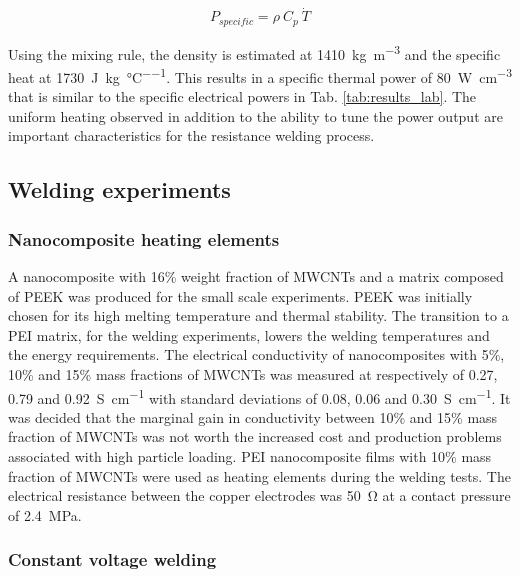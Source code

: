 \documentclass[11pt,review,times]{elsarticle}
\begin{document}
\begin{equation}
P_{specific} = \rho \ C_p \ \dot{T}
\label{eq:specific_power}
\end{equation}

Using the mixing rule, the density is estimated at \SI{1410}{\kilo\gram\per\cubic\metre} and the specific heat at \SI{1730}{\joule\per\kilo\gram\per\celsius}. 
This results in a specific thermal power of \SI{80}{\watt\per\cubic\centi\metre} that is similar to the specific electrical powers in Tab. \ref{tab:results_lab}. 
The uniform heating observed in addition to the ability to tune the power output are important characteristics for the resistance welding process.  

\FloatBarrier

\subsection{Welding experiments}

\subsubsection{Nanocomposite heating elements}

A nanocomposite with 16\% weight fraction of MWCNTs and a matrix composed of PEEK was produced for the small scale experiments. 
PEEK was initially chosen for its high melting temperature and thermal stability. 
The transition to a PEI matrix, for the welding experiments, lowers the welding temperatures and the energy requirements. 
The electrical conductivity of nanocomposites with 5\%, 10\% and 15\% mass fractions of MWCNTs was measured at respectively of 0.27, 0.79 and \SI{0.92}{\siemens\per\centi\metre} with standard deviations of 0.08, 0.06 and \SI{0.30}{\siemens\per\centi\metre}. 
It was decided that the marginal gain in conductivity between 10\% and 15\% mass fraction of MWCNTs was not worth the increased cost and production problems associated with high particle loading. 
PEI nanocomposite films with 10\% mass fraction of MWCNTs were used as heating elements during the welding tests. 
The electrical resistance between the copper electrodes was \SI{50}{\ohm} at a contact pressure of \SI{2.4}{\mega\pascal}. 

\subsubsection{Constant voltage welding}
\end{document}
